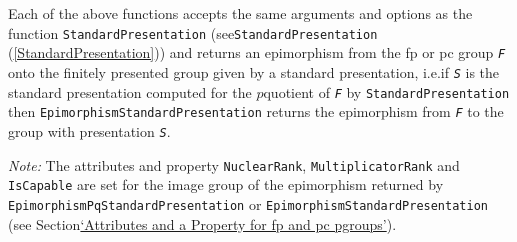 \documentclass[a4paper,11pt]{report}
\begin{document}
{{{ Each of the above functions accepts the same arguments and options as the
function \texttt{StandardPresentation} (see{\nobreakspace}\texttt{StandardPresentation} (\ref{StandardPresentation})) and returns an epimorphism from the fp or pc group \mbox{\texttt{\mdseries\slshape F}} onto the finitely presented group given by a standard presentation,
i.e.{\nobreakspace}if \mbox{\texttt{\mdseries\slshape S}} is the standard presentation computed for the $p$\texttt{}quotient of \mbox{\texttt{\mdseries\slshape F}} by \texttt{StandardPresentation} then \texttt{EpimorphismStandardPresentation} returns the epimorphism from \mbox{\texttt{\mdseries\slshape F}} to the group with presentation \mbox{\texttt{\mdseries\slshape S}}. 

 \emph{Note:} The attributes and property \texttt{NuclearRank}, \texttt{MultiplicatorRank} and \texttt{IsCapable} are set for the image group of the epimorphism returned by \texttt{EpimorphismPqStandardPresentation} or \texttt{EpimorphismStandardPresentation} (see Section{\nobreakspace}\hyperref[Attributes and a Property for fp and pc p-groups]{`Attributes and a Property for fp and pc p\texttt{}groups'}). 

}}}
\end{document}
